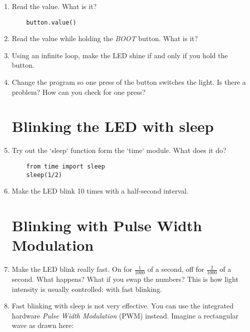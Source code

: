 \documentclass{../tutorial}
\begin{document}
\begin{enumerate}
\item
    Read the value. What is it?

    \begin{lstlisting}
    button.value()
    \end{lstlisting}

\item
    Read the value while holding the \emph{BOOT} button. What is it?

    \begin{comment}
        The \emph{BOOT} button is next to the USB connector.
        Don't confuse it with \emph{EN}!
    \end{comment}

\item
    Using an infinite loop, make the LED shine if and only if you hold the button.

\item
    Change the program so one press of the button switches the light.
    Is there a problem? How can you check for one press?

\section{Blinking the LED with sleep}

\item
    Try out the `sleep` function form the `time` module.
    What does it do?

    \begin{lstlisting}
    from time import sleep
    sleep(1/2)
    \end{lstlisting}

\item
    Make the LED blink 10 times with a half-second interval.

\section{Blinking with Pulse Width Modulation}

\item
    Make the LED blink really fast.
    On for $\frac{1}{1000}$ of a second, off for $\frac{2}{1000}$ of a second.
    What happens? What if you swap the numbers?
    This is how light intensity is usually controlled: with fast blinking.

\item
    Fast blinking with sleep is not very effective.
    You can use the integrated hardware \emph{Pulse Width Modulation} (PWM) instead.
    Imagine a rectangular wave as drawn here:


\end{enumerate}
\end{document}
